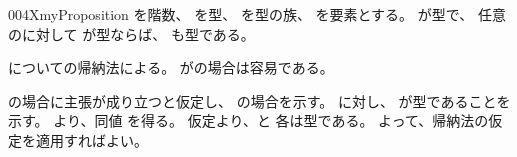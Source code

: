 \documentclass[index]{subfiles}
\begin{document}
\begin{myBlock}{004X}{myProposition}
  を階数、
  を型、
  を型の族、
  を要素とする。
  が型で、
  任意のに対して
  が型ならば、
  も型である。
\end{myBlock}
\begin{myProof}
  についての帰納法による。
  が\myInlineMath{\myTLMinusTwo}の場合は容易である。

  の場合に主張が成り立つと仮定し、
  の場合を示す。
  に対し、
  が型であることを示す。
  より、同値
  を得る。
  仮定より、と
  各は型である。
  よって、帰納法の仮定を適用すればよい。
\end{myProof}
\end{document}
